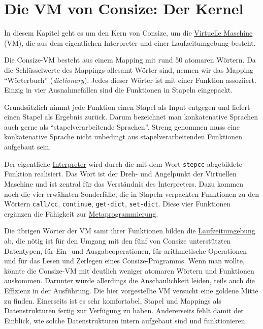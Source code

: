 \chapter{Die VM von Consize: Der Kernel}
\label{Sec:ConsizeVM}

In diesem Kapitel geht es um den Kern von Consize, um die \href{http://de.wikipedia.org/wiki/Virtuelle_Maschine}{Virtuelle Maschine} (VM), die aus dem eigentlichen Interpreter und einer Laufzeitumgebung besteht.

Die Consize-VM besteht aus einem Mapping mit rund 50 atomaren Wör\-tern. Da die Schlüsselwerte des Mappings allesamt Wörter sind, nennen wir das Mapping "`Wörterbuch"' (\emph{dictionary}). Jedes dieser Wörter ist mit einer Funktion assoziiert. Einzig in vier Ausnahmefällen sind die Funktionen in Stapeln eingepackt.

Grundsätzlich nimmt jede Funktion einen Stapel als Input entgegen und liefert einen Stapel als Ergebnis zurück. Darum bezeichnet man konkatenative Sprachen auch gerne als "`stapelverarbeitende Sprachen"'. Streng genommen muss eine konkatenative Sprache nicht unbedingt aus stapelverarbeitenden Funktionen aufgebaut sein.

Der eigentliche \href{http://de.wikipedia.org/wiki/Interpreter}{Interpreter} wird durch die mit dem Wort \verb|stepcc| abgebildete Funktion realisiert. Das Wort ist der Dreh- und Angelpunkt der Virtuellen Maschine und ist zentral für das Verständnis des Interpreters. Dazu kommen noch die vier erwähnten Sonderfälle, die in Stapeln verpackten Funktionen zu den Wörtern \verb|call/cc|, \verb|continue|, \verb|get-dict|, \verb|set-dict|. Diese vier Funktionen ergänzen die Fähigkeit zur \href{http://de.wikipedia.org/wiki/Metaprogrammierung}{Metaprogrammierung}.

Die übrigen Wörter der VM samt ihrer Funktionen bilden die \href{http://de.wikipedia.org/wiki/Laufzeitumgebung}{Laufzeitumgebung} ab, die nötig ist für den Umgang mit den fünf von Consize unterstützten Datentypen, für Ein- und Ausgabeoperationen, für arithmetische Operationen und für das Lesen und Zerlegen eines Consize-Programms. Wenn man wollte, könnte die Consize-VM mit deutlich weniger atomaren Wörtern und Funktionen auskommen. Darunter würde allerdings die Anschaulichkeit leiden, teils auch die Effizienz in der Aus\-füh\-rung. Die hier vorgestellte VM versucht eine goldene Mitte zu finden. Einerseits ist es sehr komfortabel, Stapel und Mappings als Datenstrukturen fertig zur Verfügung zu haben. Andererseits fehlt damit der Einblick, wie solche Datenstrukturen intern aufgebaut sind und funktionieren.

